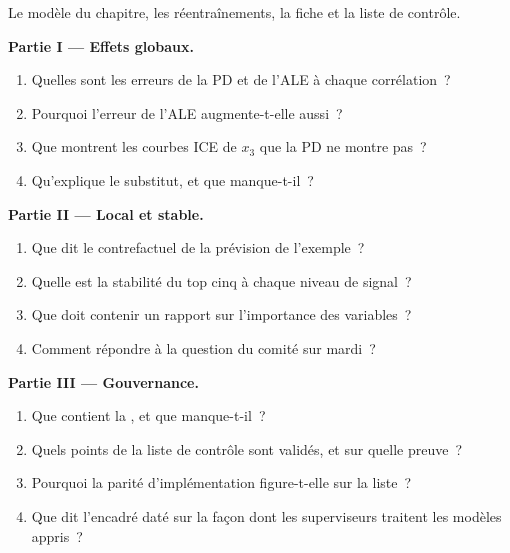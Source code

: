 \begin{problem}\label{pb:ml:interpretability-and-model-governance:1}
Le modèle du chapitre, les réentraînements, la fiche et la liste de contrôle.

\medskip\noindent\textbf{Partie I --- Effets globaux.}
\begin{enumerate}
\item Quelles sont les erreurs de la PD et de l'ALE à chaque corrélation~?
\item Pourquoi l'erreur de l'ALE augmente-t-elle aussi~?
\item Que montrent les courbes ICE de $x_3$ que la PD ne montre pas~?
\item Qu'explique le substitut, et que manque-t-il~?
\end{enumerate}

\medskip\noindent\textbf{Partie II --- Local et stable.}
\begin{enumerate}[resume]
\item Que dit le contrefactuel de la prévision de l'exemple~?
\item Quelle est la stabilité du top cinq à chaque niveau de signal~?
\item Que doit contenir un rapport sur l'importance des variables~?
\item Comment répondre à la question du comité sur mardi~?
\end{enumerate}

\medskip\noindent\textbf{Partie III --- Gouvernance.}
\begin{enumerate}[resume]
\item Que contient la , et que manque-t-il~?
\item Quels points de la liste de contrôle sont validés, et sur quelle preuve~?
\item Pourquoi la parité d'implémentation figure-t-elle sur la liste~?
\item Que dit l'encadré daté sur la façon dont les superviseurs traitent les modèles appris~?
\end{enumerate}


\end{problem}
